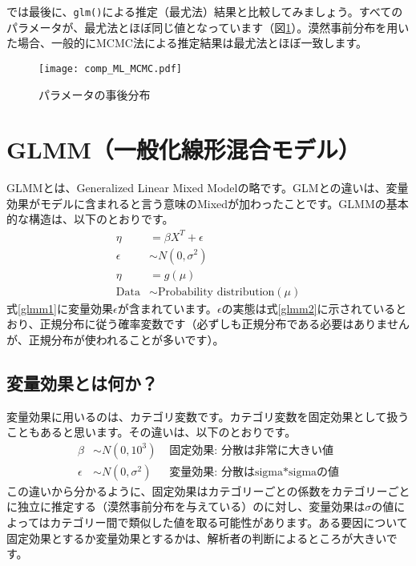 では最後に、\verb|glm()|による推定（最尤法）結果と比較してみましょう。すべてのパラメータが、最尤法とほぼ同じ値となっています（図\ref{comp_ML_MCMC}）。漠然事前分布を用いた場合、一般的にMCMC法による推定結果は最尤法とほぼ一致します。
\begin{figure}[htb]
\begin{center}
\graphicspath{{3_glm/figs/}}
\texttt{[image: comp\_ML\_MCMC.pdf]}\\
\caption{パラメータの事後分布}
\label{comp_ML_MCMC}
\end{center}
\end{figure}

\clearpage
\section{GLMM（一般化線形混合モデル）}
GLMMとは、Generalized Linear Mixed Modelの略です。GLMとの違いは、変量効果がモデルに含まれると言う意味のMixedが加わったことです。GLMMの基本的な構造は、以下のとおりです。
\begin{align}
\eta &=  \beta X^{T}  + \epsilon \label{glmm1}\\
\epsilon &\sim N(0, \sigma^{2}) \label{glmm2}\\
\eta &= g(\mu) \label{glmm3}\\
\mathrm{Data} &\sim \text{Probability distribution}(\mu)\label{glmm4}
\end{align}
式\ref{glmm1}に変量効果$\epsilon$が含まれています。$\epsilon$の実態は式\ref{glmm2}に示されているとおり、正規分布に従う確率変数です（必ずしも正規分布である必要はありませんが、正規分布が使われることが多いです）。

\subsection{変量効果とは何か？}
変量効果に用いるのは、カテゴリ変数です。カテゴリ変数を固定効果として扱うこともあると思います。その違いは、以下のとおりです。
\begin{align}
\beta &\sim N(0, 10^{3}) &\text{ 固定効果: 分散は非常に大きい値} \\
\epsilon &\sim N(0, \sigma^{2}) &\text{ 変量効果: 分散はsigma$*$sigmaの値} 
\end{align}
この違いから分かるように、固定効果はカテゴリーごとの係数をカテゴリーごとに独立に推定する（漠然事前分布を与えている）のに対し、変量効果は$\sigma$の値によってはカテゴリー間で類似した値を取る可能性があります。ある要因について固定効果とするか変量効果とするかは、解析者の判断によるところが大きいです。

